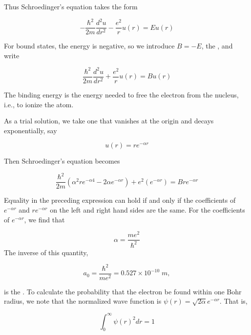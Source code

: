 Thus Schroedinger's equation takes the form

\begin{equation}
-\frac{\hbar^2}{2m} \frac{ d^2u }{ dr^2 } - \frac{e^2}{r}u(r) = Eu(r)
\end{equation}

For bound states, the energy is negative, so we introduce $B = -E$, the , and write

\begin{equation}
\frac{\hbar^2}{2m} \frac{ d^2u }{ dr^2 } + \frac{e^2}{r}u(r) = Bu(r)
\end{equation}

The binding energy is the energy needed to free the electron from the nucleus, i.e., to ionize the atom.


As a trial solution, we take one that vanishes at the origin and decays exponentially, say

\begin{equation}
u(r) = re^{-\alpha r}
\end{equation}

Then Schroedinger's equation becomes

\begin{equation}
\frac{\hbar^2}{2m}\left(  \alpha^2 r e^{-\alpha 4} - 2\alpha e^{-\alpha r} \right) + e^2 (e^{ -\alpha r }) = Bre^{-\alpha r}
\end{equation}

Equality in the preceding expression can hold if and only if 
the coefficients of  $e^{-\alpha r}$ and  $re^{-\alpha r}$ 
on the left and right hand sides are the same.  For the coefficients of $e^{-\alpha r}$, we find that

\begin{equation}
\alpha = \frac{ me^2 }{ \hbar^2 }
\end{equation}
The inverse of this quantity, 

\begin{equation}
a_0= \frac{ \hbar^2 }{ me^2 }  = 0.527\times 10^{-10}\;m,
\end{equation}

is the .  To calculate the probability that the electron be found within one Bohr radius, we note that the normalized wave function is $\psi(r) = \sqrt{2\alpha}e^{-\alpha r}$.  That is,

\begin{equation}
\int_0^\infty \psi(r)^2 dr = 1
\end{equation}


